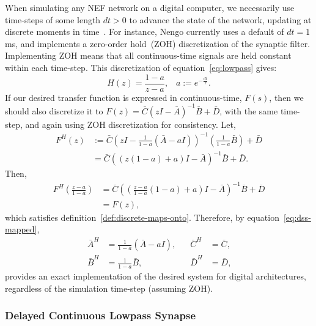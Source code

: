 When simulating any NEF network on a digital computer, we necessarily use time-steps of some length $dt > 0$ to advance the state of the network, updating at discrete moments in time~\citep{bekolay2013nengo}.
For instance, Nengo currently uses a default of $dt = 1$\,ms, and implements a zero-order hold~(ZOH) discretization of the synaptic filter.
Implementing ZOH means that all continuous-time signals are held constant within each time-step.
This discretization of equation~\ref{eq:lowpass} gives:
\begin{equation}
H(z) = \frac{1 - a}{z - a} \text{,} \quad a := e^{-\frac{dt}{\tau}} \text{.} \nonumber
\end{equation}
If our desired transfer function is expressed in continuous-time, $F(s)$, then we should also discretize it to $F(z) = \bar{C} (zI - \bar{A})^{-1} \bar{B} + \bar{D}$, with the same time-step, and again using ZOH discretization for consistency.
Let,
\begin{align*}
F^H(z) &:= \bar{C} \left(zI - \frac{1}{1 - a} \left(\bar{A} - aI \right) \right)^{-1} \left( \frac{1}{1-a}\bar{B} \right) + \bar{D} \\
&= \bar{C} \left( \left(z(1 - a) + a \right)I - \bar{A} \right)^{-1}\bar{B} + \bar{D} \text{.}
\end{align*}
Then, 
\begin{align*}
F^H \left( \frac{z-a}{1-a} \right) &= \bar{C}\left( \left( \frac{z-a}{1-a}(1 - a) + a \right)I - \bar{A} \right)^{-1}\bar{B} + \bar{D} \\
&= F(z) \text{,}
\end{align*}
which satisfies definition~\ref{def:discrete-maps-onto}.
Therefore, by equation~\ref{eq:dss-mapped},\begin{equation} \label{eq:discrete-p3}
\begin{aligned}
\bar{A}^H &= \frac{1}{1 - a} \left(\bar{A} - aI\right) \text{,} & \quad \bar{C}^H &= \bar{C} \text{,} \\
\bar{B}^H &= \frac{1}{1-a}\bar{B} \text{,} & \quad \bar{D}^H &= \bar{D} \text{,}
\end{aligned}
\end{equation}
provides an exact implementation of the desired system for digital architectures, regardless of the simulation time-step (assuming ZOH).

\subsubsection{Delayed Continuous Lowpass Synapse}

